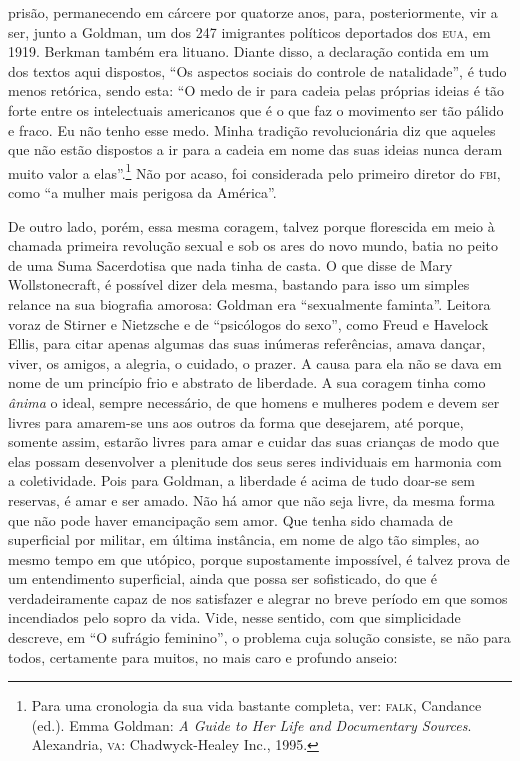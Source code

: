 prisão, permanecendo em cárcere por quatorze anos, para, posteriormente,
vir a ser, junto a Goldman, um dos 247 imigrantes políticos deportados
dos \textsc{eua}, em 1919. Berkman também era lituano. Diante disso, a declaração
contida em um dos textos aqui dispostos, ``Os aspectos sociais do
controle de natalidade'', é tudo menos retórica, sendo esta: ``O medo de
ir para cadeia pelas próprias ideias é tão forte entre os intelectuais
americanos que é o que faz o movimento ser tão pálido e fraco. Eu não
tenho esse medo. Minha tradição revolucionária diz que aqueles que não
estão dispostos a ir para a cadeia em nome das suas ideias nunca deram
muito valor a elas''.\footnote{Para uma cronologia da sua vida bastante
  completa, ver: \textsc{falk}, Candance (ed.). Emma Goldman: \emph{A Guide to
  Her Life and Documentary Sources}. Alexandria, \textsc{va}: Chadwyck-Healey
  Inc., 1995.} Não por acaso, foi considerada pelo primeiro diretor do
\textsc{fbi}, como ``a mulher mais perigosa da América''.

De outro lado, porém, essa mesma coragem, talvez porque florescida em
meio à chamada primeira revolução sexual e sob os ares do novo mundo,
batia no peito de uma Suma Sacerdotisa que nada tinha de casta. O que
disse de Mary Wollstonecraft, é possível dizer dela mesma, bastando para
isso um simples relance na sua biografia amorosa: Goldman era
``sexualmente faminta''. Leitora voraz de Stirner e Nietzsche e de
``psicólogos do sexo'', como Freud e Havelock Ellis, para citar apenas
algumas das suas inúmeras referências, amava dançar, viver, os amigos, a
alegria, o cuidado, o prazer. A causa para ela não se dava em nome de um
princípio frio e abstrato de liberdade. A sua coragem tinha como
\textit{ânima} o ideal, sempre necessário, de que homens e mulheres podem e
devem ser livres para amarem-se uns aos outros da forma que desejarem,
até porque, somente assim, estarão livres para amar e cuidar das suas
crianças de modo que elas possam desenvolver a plenitude dos seus seres
individuais em harmonia com a coletividade. Pois para Goldman, a
liberdade é acima de tudo doar-se sem reservas, é amar e ser amado. Não
há amor que não seja livre, da mesma forma que não pode haver
emancipação sem amor. Que tenha sido chamada de superficial por militar,
em última instância, em nome de algo tão simples, ao mesmo tempo em que
utópico, porque supostamente impossível, é talvez prova de um
entendimento superficial, ainda que possa ser sofisticado, do que é
verdadeiramente capaz de nos satisfazer e alegrar no breve período em
que somos incendiados pelo sopro da vida. Vide, nesse sentido, com que
simplicidade descreve, em ``O sufrágio feminino'', o problema cuja
solução consiste, se não para todos, certamente para muitos, no mais
caro e profundo anseio:

